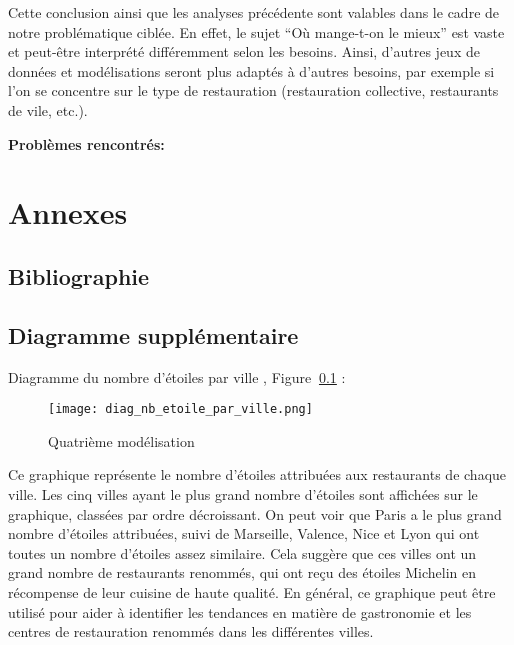 \documentclass[mstat,12pt]{unswthesis}
\begin{document}
\medskip

Cette conclusion ainsi que les analyses précédente sont valables dans le
cadre de notre problématique ciblée. En effet, le sujet ``Où mange-t-on
le mieux'' est vaste et peut-être interprété différemment selon les
besoins. Ainsi, d'autres jeux de données et modélisations seront plus
adaptés à d'autres besoins, par exemple si l'on se concentre sur le type
de restauration (restauration collective, restaurants de vile, etc.).

\bigskip

\textbf{Problèmes rencontrés:}

\hypertarget{annexes}{%
\chapter*{Annexes}\label{annexes}}

\hypertarget{bibliographie}{%
\section*{Bibliographie}\label{bibliographie}}

\hypertarget{refs}{}
\begin{CSLReferences}{0}{0}
\end{CSLReferences}




\bigskip

\hypertarget{diagramme-suppluxe9mentaire}{%
\section{\texorpdfstring{\textbf{Diagramme
supplémentaire}}{Diagramme supplémentaire}}\label{diagramme-suppluxe9mentaire}}

Diagramme du nombre d'étoiles par ville , Figure \(~\)\ref{diag4} :

\begin{figure}
\hypertarget{diag4}{%
\centering
\texttt{[image: diag\_nb\_etoile\_par\_ville.png]}
\caption{Quatrième modélisation}\label{diag4}
}
\end{figure}

\bigskip

Ce graphique représente le nombre d'étoiles attribuées aux restaurants
de chaque ville. Les cinq villes ayant le plus grand nombre d'étoiles
sont affichées sur le graphique, classées par ordre décroissant. On peut
voir que Paris a le plus grand nombre d'étoiles attribuées, suivi de
Marseille, Valence, Nice et Lyon qui ont toutes un nombre d'étoiles
assez similaire. Cela suggère que ces villes ont un grand nombre de
restaurants renommés, qui ont reçu des étoiles Michelin en récompense de
leur cuisine de haute qualité. En général, ce graphique peut être
utilisé pour aider à identifier les tendances en matière de gastronomie
et les centres de restauration renommés dans les différentes villes.
\end{document}
